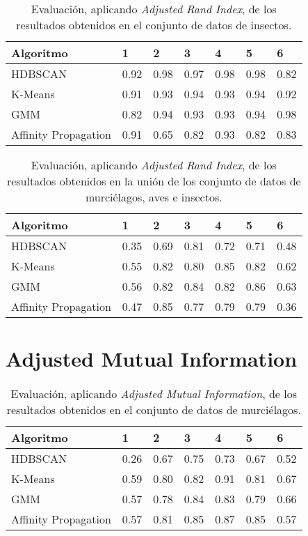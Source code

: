 \begin{table}[H]
    \centering
    \begin{tabular}{lllllll}
        \hline
        Algoritmo & 1 & 2 & 3 & 4 & 5 & 6  \\ \hline
        HDBSCAN & 0.92 & \cellcolor[HTML]{FFFC9E}0.98 & 0.97 & \cellcolor[HTML]{FFFC9E}0.98 & \cellcolor[HTML]{FFFC9E}0.98 & 0.82 \\
        K-Means & 0.91 & 0.93 & 0.94 & 0.93 & 0.94 & 0.92 \\
        GMM & 0.82 & 0.94 & 0.93 & 0.93 & 0.94 & \cellcolor[HTML]{FFFC9E}0.98 \\
        Affinity Propagation & 0.91 & 0.65 & 0.82 & 0.93 & 0.82 & 0.83 \\
    \end{tabular}
    \caption{Evaluación, aplicando \textit{Adjusted Rand Index}, de los resultados obtenidos en el conjunto de datos de insectos.}
    \label{table:insects-ari}
\end{table}

\begin{table}[H]
    \centering
    \begin{tabular}{lllllll}
        \hline
        Algoritmo & 1 & 2 & 3 & 4 & 5 & 6  \\ \hline
        HDBSCAN & 0.35 & 0.69 & 0.81 & 0.72 & 0.71 & 0.48 \\
        K-Means & 0.55 & 0.82 & 0.80 & 0.85 & 0.82 & 0.62 \\
        GMM & 0.56 & 0.82 & 0.84 & 0.82 & \cellcolor[HTML]{FFFC9E}0.86 & 0.63 \\
        Affinity Propagation & 0.47 & 0.85 & 0.77 & 0.79 & 0.79 & 0.36 \\
    \end{tabular}
    \caption{Evaluación, aplicando \textit{Adjusted Rand Index}, de los resultados obtenidos en la unión de los conjunto de datos de murciélagos, aves e insectos.}
    \label{table:all-ari}
\end{table}

\section{Adjusted Mutual Information}\label{sec:AMI-evaluation}

\begin{table}[H]
    \centering
    \begin{tabular}{lllllll}
        \hline
        Algoritmo & 1 & 2 & 3 & 4 & 5 & 6  \\ \hline
        HDBSCAN & 0.26 & 0.67 & 0.75 & 0.73 & 0.67 & 0.52 \\
        K-Means & 0.59 & 0.80 & 0.82 & \cellcolor[HTML]{FFFC9E}0.91 & 0.81 & 0.67 \\
        GMM & 0.57 & 0.78 & 0.84 & 0.83 & 0.79 & 0.66 \\
        Affinity Propagation & 0.57 & 0.81 & 0.85 & 0.87 & 0.85 & 0.57 \\
    \end{tabular}
    \caption{Evaluación, aplicando \textit{Adjusted Mutual Information}, de los resultados obtenidos en el conjunto de datos de murciélagos.}
    \label{table:bats-ami}
\end{table}

